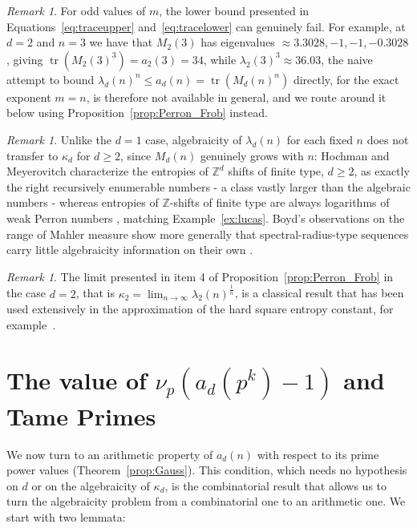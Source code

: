 \documentclass{article}
\theoremstyle{plain}
\theoremstyle{definition}
\theoremstyle{remark}
\newtheorem{remark}[theorem]{Remark}
\newcommand{\Z}{\mathbb{Z}}
\DeclareMathOperator{\tr}{tr}
\begin{document}
\begin{remark}
    For odd values of $m$, the lower bound presented in Equations~\ref{eq:traceupper} and~\ref{eq:tracelower} can genuinely fail. For example, at $d=2$ and $n=3$ we have that $M_2(3)$ has eigenvalues $\approx3.3028,-1,-1,-0.3028$, giving $\tr(M_2(3)^3)=a_2(3)=34$, while $\lambda_2(3)^3\approx36.03$, the naive attempt to bound $\lambda_d(n)^n\le a_d(n)=\tr(M_d(n)^n)$ directly, for the exact exponent $m=n$, is therefore not available in general, and we route around it below using Proposition~\ref{prop:Perron_Frob} instead.
\end{remark}

\begin{remark}\textup{
Unlike the $d=1$ case, algebraicity of $\lambda_d(n)$ for each fixed $n$ does not transfer to $\kappa_d$ for $d\ge2$, since $M_d(n)$ genuinely grows with $n$: Hochman and Meyerovitch characterize the entropies of $\Z^d$ shifts of finite type, $d\ge2$, as exactly the right recursively enumerable numbers \cite{HM2010} - a class vastly larger than the algebraic numbers - whereas entropies of $\Z$-shifts of finite type are always logarithms of weak Perron numbers \cite{Lind1984,PavlovSchraudner2015}, matching Example~\ref{ex:lucas}. Boyd's observations on the range of Mahler measure show more generally that spectral-radius-type sequences carry little algebraicity information on their own \cite{Boyd1981}.}
\end{remark}
\begin{remark}
    The limit presented in item 4 of Proposition~\ref{prop:Perron_Frob} in the case $d=2$, that is $\kappa_2=\lim_{n \to \infty} \lambda_2(n)^{\frac{1}{n}}$, is a classical result that has been used extensively in the approximation of the hard square entropy constant, for example~\cite{CalkinWilf1998}.
\end{remark}

\section{The value of $\nu_p(a_d(p^k)-1)$ and Tame Primes}\label{sec:tame}

We now turn to an arithmetic property of $a_d(n)$ with respect to its prime power values (Theorem~\ref{prop:Gauss}). This condition, which needs no hypothesis on $d$ or on the algebraicity of $\kappa_d$, is the combinatorial result that allows us to turn the  algebraicity problem from a combinatorial one to an arithmetic one. We start with two lemmata:
\end{document}
